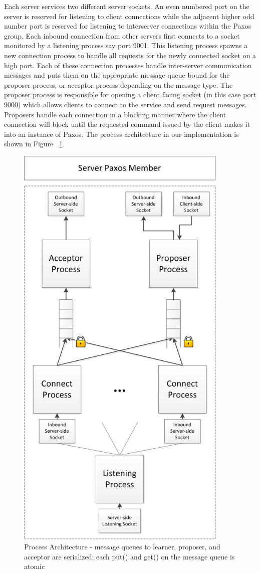 \documentclass{article}
\begin{document}
Each server services two different server sockets.
An even numbered port on the server is reserved for listening to client connections while the adjacent higher odd number port is reserved for listening to interserver connections within the Paxos group.
Each inbound connection from other servers first connects to a socket monitored by a listening process say port 9001.
This listening process spawns a new connection process to handle all requests for the newly connected socket on a high port.
Each of these connection processes handle inter-server communication messages and puts them on the appropriate message queue bound for the proposer process, or acceptor process depending on the message type.
The proposer process is responsible for opening a client facing socket (in this case port 9000) which allows clients to connect to the service and send request messages.
Proposers handle each connection in a blocking manner where the client connection will block until the requested command issued by the client makes it into an instance of Paxos.
The process architecture in our implementation is shown in Figure ~\ref{paxos_member}.

\begin{figure}
\centering
\includegraphics[width=4in]{paxos_member_architecture.jpg}
\caption{Process Architecture - message queues to learner, proposer, and acceptor are serialized; each put() and get() on the message queue is atomic}
\label{paxos_member}
\end{figure}
\end{document}
